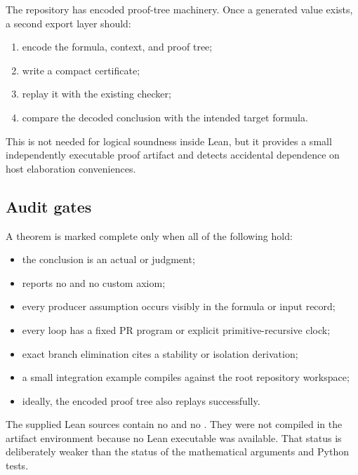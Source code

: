 The repository has encoded proof-tree machinery.  Once a generated  value exists, a second export layer should:

\begin{enumerate}
  \item encode the formula, context, and proof tree;
  \item write a compact certificate;
  \item replay it with the existing checker;
  \item compare the decoded conclusion with the intended target formula.
\end{enumerate}

This is not needed for logical soundness inside Lean, but it provides a small independently executable proof artifact and detects accidental dependence on host elaboration conveniences.

\subsection{Audit gates}

A theorem is marked complete only when all of the following hold:

\begin{itemize}
  \item the conclusion is an actual  or  judgment;
  \item {} reports no  and no custom axiom;
  \item every producer assumption occurs visibly in the formula or input record;
  \item every loop has a fixed PR program or explicit primitive-recursive clock;
  \item exact branch elimination cites a stability or isolation derivation;
  \item a small integration example compiles against the root repository workspace;
  \item ideally, the encoded proof tree also replays successfully.
\end{itemize}

The supplied Lean sources contain no  and no .  They were not compiled in the artifact environment because no Lean executable was available.  That status is deliberately weaker than the status of the mathematical arguments and Python tests.
